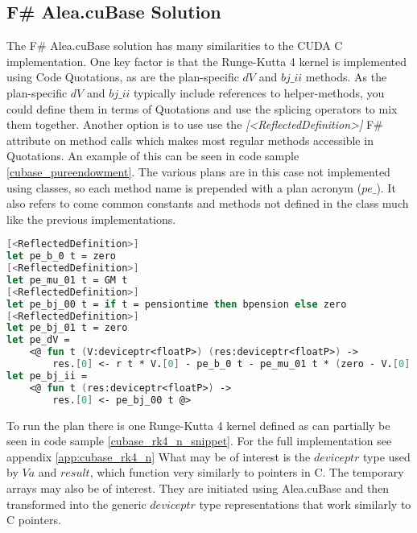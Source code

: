 \subsection{F\# Alea.cuBase Solution}
The F\# Alea.cuBase solution has many similarities to the CUDA C implementation.
One key factor is that the Runge-Kutta 4 kernel is implemented using Code Quotations, as are the plan-specific $dV$ and $bj\_ii$ methods.
As the plan-specific $dV$ and $bj\_ii$ typically include references to helper-methods, you could define them in terms of Quotations and use the splicing operators to mix them together.
Another option is to use use the \textit{[\textless{}ReflectedDefinition\textgreater{}]} F\# attribute on method calls which makes most regular methods accessible in Quotations.
An example of this can be seen in code sample \ref{cubase_pureendowment}. 
The various plans are in this case not implemented using classes, so each method name is prepended with a plan acronym ($pe\_$).
It also refers to come common constants and methods not defined in the class much like the previous implementations.

\begin{lstlisting}[language=FSharp, caption=The pure endowment insurance plan expressed in F\# Alea.cuBase, label=cubase_pureendowment]
[<ReflectedDefinition>] 
let pe_b_0 t = zero
[<ReflectedDefinition>]
let pe_mu_01 t = GM t
[<ReflectedDefinition>]
let pe_bj_00 t = if t = pensiontime then bpension else zero
[<ReflectedDefinition>]
let pe_bj_01 t = zero
let pe_dV = 
	<@ fun t (V:deviceptr<floatP>) (res:deviceptr<floatP>) -> 
		res.[0] <- r t * V.[0] - pe_b_0 t - pe_mu_01 t * (zero - V.[0] + pe_bj_01 t) @>
let pe_bj_ii = 
	<@ fun t (res:deviceptr<floatP>) ->
		res.[0] <- pe_bj_00 t @>
\end{lstlisting}

To run the plan there is one Runge-Kutta 4 kernel defined as can partially be seen in code sample \ref{cubase_rk4_n_snippet}. For the full implementation see appendix \ref{app:cubase_rk4_n}
What may be of interest is the $deviceptr$ type used by $Va$ and $result$, which function very similarly to pointers in C.
The temporary arrays may also be of interest. They are initiated using Alea.cuBase and then transformed into the generic $deviceptr$ type representations that work similarly to C pointers.

